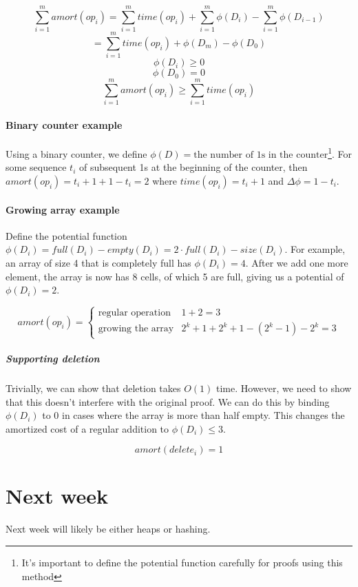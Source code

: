 \documentclass[a4paper]{article}
\begin{document}
\[\sum_{i=1}^mamort(op_i)=\sum_{i=1}^mtime(op_i)+\sum_{i=1}^m\phi(D_i)-\sum_{i=1}^m\phi(D_{i-1})\]
\[=\sum_{i=1}^mtime(op_i)+\phi(D_m)-\phi(D_0)\]
\[\phi(D_i)\ge0\]
\[\phi(D_0)=0\]
\[\sum_{i=1}^mamort(op_i) \ge \sum_{i=1}^mtime(op_i)\]

\paragraph{Binary counter example}
Using a binary counter, we define $\phi(D)=\text{the number of 1s in the counter}$\footnote{It's important to define the potential function carefully for proofs using this method}. For some sequence $t_i$ of subsequent 1s at the beginning of the counter, then $amort(op_i)=t_i+1+1-t_i=2$ where $time(op_i)=t_i+1$ and $\Delta\phi=1-t_i$.

\paragraph{Growing array example}
Define the potential function $\phi(D_i)=full(D_i)-empty(D_i)=2\cdot full(D_i)-size(D_i)$. For example, an array of size 4 that is completely full has $\phi(D_i)=4$. After we add one more element, the array is now has 8 cells, of which 5 are full, giving us a potential of $\phi(D_i)=2$.

\[
amort(op_i)=
\begin{cases}
\text{regular operation} & 1+2=3 \\
\text{growing the array} & 2^k+1+2^k+1-(2^k-1)-2^k=3
\end{cases}
\]

\subparagraph{Supporting deletion}
Trivially, we can show that deletion takes $O(1)$ time. However, we need to show that this doesn't interfere with the original proof. We can do this by binding $\phi(D_i)$ to 0 in cases where the array is more than half empty. This changes the amortized cost of a regular addition to $\phi(D_i)\le3$.

\[amort(delete_i)=1\]

\section{Next week}

Next week will likely be either heaps or hashing.
\end{document}
